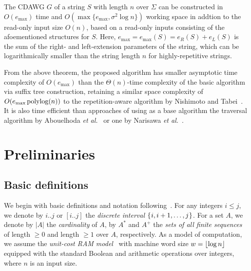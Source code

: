 \documentclass{article}
\begin{document}
\begin{theorem}
  The CDAWG $G$ of a string $S$ with length $n$ over $\Sigma$ can be constructed in $O(e_{\max})$ time and $O(\max\{e_{\max}, \sigma^2\log n\})$ working space in addtion to the read-only input size $O(n)$, based on a read-only inputs consisting of the afoementioned structures for $S$.  
Here, $e_{\max} = e_{\max}(S) = e_R(S) + e_L(S)$ is the sum of the right- and left-extension parameters of the string, which can be logarithmically smaller than the string length $n$ for highly-repetitive strings.\end{theorem}

From the above theorem, the proposed algorithm has smaller asymptotic time complexity of $O(e_{\max})$ than the $\Theta(n)$-time complexity of the basic algorithm via suffix tree construction, retaining a similar space complexity of $O(e_{\max}\,\mathrm{polylog}(n))$ to the repetition-aware algorithm by Nishimoto and Tabei~\cite{nishimoto:cpm2021enum}.
It is also time efficient than approaches of using as a base algorithm the traversal algorithm by Abouelhoda \textit{et al.}~\cite{abouelhoda2004replacing} or one by Narisawa \textit{et al.}~\cite{narisawa2007efficient}. 



\section{Preliminaries}
\label{sec:prelim}

\subsection{Basic definitions}
We begin with basic definitions and notation following~\cite{charalampopoulos2018extended,barton2014linear,ilie2011minimum,belazzougui2015space:unusual}.
For any integers $i\le j$, we denote by $i..j$ or $[i..j]$ the \textit{discrete interval} $\{\kern0.05emi, i+1, \dots, j\kern0.05em\}$. For a set $A$, we denote by $|A|$ the \textit{cardinality} of $A$, by $A^*$ and $A^+$ the \textit{sets of all finite sequences} of length $\ge 0$ and length $\ge 1$ over $A$, respectively.
As a model of computation, we assume the \textit{unit-cost RAM model}~\cite{cormen2009introduction} with machine word size $w = \lfloor \log n\rfloor$ equipped with the standard Boolean and arithmetic operations over integers, where $n$ is an input size.
\end{document}
